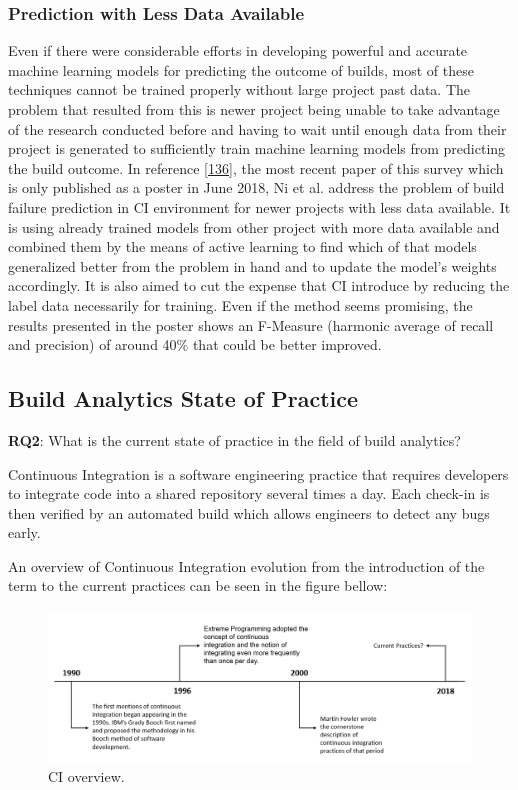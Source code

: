 \documentclass[]{book}
\begin{document}
\subsubsection{Prediction with Less Data
Available}\label{prediction-with-less-data-available}

Even if there were considerable efforts in developing powerful and
accurate machine learning models for predicting the outcome of builds,
most of these techniques cannot be trained properly without large
project past data. The problem that resulted from this is newer project
being unable to take advantage of the research conducted before and
having to wait until enough data from their project is generated to
sufficiently train machine learning models from predicting the build
outcome. In reference {[}\protect\hyperlink{ref-ni2018acona}{136}{]},
the most recent paper of this survey which is only published as a poster
in June 2018, Ni et al. address the problem of build failure prediction
in CI environment for newer projects with less data available. It is
using already trained models from other project with more data available
and combined them by the means of active learning to find which of that
models generalized better from the problem in hand and to update the
model's weights accordingly. It is also aimed to cut the expense that CI
introduce by reducing the label data necessarily for training. Even if
the method seems promising, the results presented in the poster shows an
F-Measure (harmonic average of recall and precision) of around 40\% that
could be better improved.

\subsection{Build Analytics State of
Practice}\label{build-analytics-state-of-practice}

\textbf{RQ2}: What is the current state of practice in the field of
build analytics?

Continuous Integration is a software engineering practice that requires
developers to integrate code into a shared repository several times a
day. Each check-in is then verified by an automated build which allows
engineers to detect any bugs early.

An overview of Continuous Integration evolution from the introduction of
the term to the current practices can be seen in the figure bellow:

\begin{figure}
\centering
\includegraphics{figures/build-analytics/state_pr.png}
\caption{CI overview.}
\end{figure}
\end{document}
